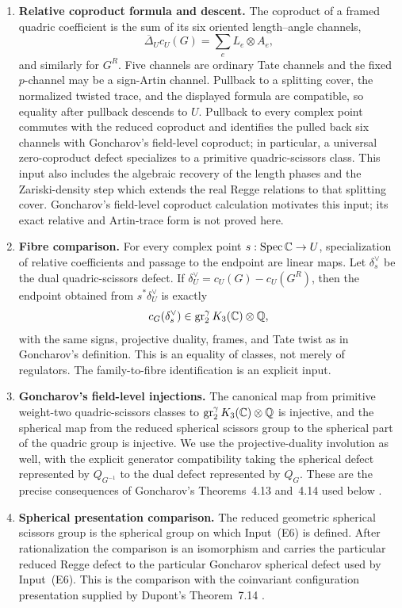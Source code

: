 \begin{enumerate}[label=\textup{(E\arabic*)},leftmargin=3.1em]
\item \textbf{Relative coproduct formula and descent.}
\label{cp:input-E4}
The coproduct of a framed quadric coefficient is the sum of its six
oriented length--angle channels,
\[
 \overline\Delta_U c_U(G)=\sum_e L_e\otimes A_e,
\]
and similarly for \(G^R\).  Five channels are ordinary Tate channels and
the fixed \(p\)-channel may be a sign-Artin channel.  Pullback to a splitting
cover, the normalized twisted trace, and the displayed formula are
compatible, so equality after pullback descends to \(U\).  Pullback to every
complex point commutes with the reduced coproduct and identifies the pulled
back six channels with Goncharov's field-level coproduct; in particular, a
universal zero-coproduct defect specializes to a primitive quadric-scissors
class.  This input also
includes the algebraic recovery of the length phases and the Zariski-density
step which extends the real Regge relations to that splitting cover.
Goncharov's
field-level coproduct calculation \cite{Goncharov1999} motivates this
input; its exact relative and Artin-trace form is not proved here.

\item \textbf{Fibre comparison.}
\label{cp:input-E5}
For every complex point \(s:\operatorname{Spec}\mathbb C\to U\), specialization of relative
coefficients and passage to the endpoint are linear maps.  Let
\(\delta_s^\vee\) be the dual quadric-scissors defect.  If
\(\delta_U^\vee=c_U(G)-c_U(G^R)\), then the endpoint obtained from
\(s^*\delta_U^\vee\) is exactly
\[
 c_G(\delta_s^\vee)
 \in \operatorname{gr}_2^\gamma K_3(\mathbb C)\otimes\mathbb Q,
\]
with the same signs, projective duality, frames, and Tate twist as in
Goncharov's definition.  This is an equality of classes, not merely of
regulators.  The family-to-fibre identification is an explicit input.

\item \textbf{Goncharov's field-level injections.}
\label{cp:input-E6}
The canonical map from primitive weight-two quadric-scissors classes to
\(\operatorname{gr}_2^\gamma K_3(\mathbb C)\otimes\mathbb Q\) is injective, and the spherical map from
the reduced spherical scissors group to the spherical part of the quadric
group is injective.  We use the projective-duality involution as well, with
the explicit generator compatibility taking the spherical defect represented
by \(Q_{G^{-1}}\) to the dual defect represented by \(Q_G\).  These
are the precise consequences of Goncharov's Theorems~4.13 and~4.14 used
below \cite{Goncharov1999}.

\item \textbf{Spherical presentation comparison.}
\label{cp:input-E7}
The reduced geometric spherical scissors group is the spherical group on
which Input~\textup{(E6)} is defined.  After rationalization the comparison is
an isomorphism and carries the particular reduced Regge defect to the
particular Goncharov spherical defect used by Input~\textup{(E6)}.  This is
the comparison with the
coinvariant configuration presentation supplied by Dupont's
Theorem~7.14 \cite{Dupont2001}.


\end{enumerate}
